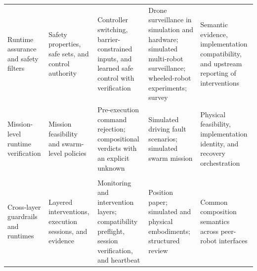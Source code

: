 \begin{table}[!t]
\begin{tabularx}{\textwidth}{@{}P{0.15\textwidth}P{0.15\textwidth}P{0.21\textwidth}P{0.21\textwidth}Y@{}}
    Runtime assurance and safety filters \cite{sha2001simplex,desai2019soter,shivakumar2020soterros,ames2017cbf,wang2017barrier,garg2024safecontrol}
      & Safety properties, safe sets, and control authority
      & Controller switching, barrier-constrained inputs, and learned safe control with verification
      & Drone surveillance in simulation and hardware; simulated multi-robot surveillance; wheeled-robot experiments; survey
      & Semantic evidence, implementation compatibility, and upstream reporting of interventions \\
    Mission-level runtime verification \cite{tsai2026missionrta,kekatos2026swarmrta}
      & Mission feasibility and swarm-level policies
      & Pre-execution command rejection; compositional verdicts with an explicit unknown
      & Simulated driving fault scenarios; simulated swarm mission
      & Physical feasibility, implementation identity, and recovery orchestration \\
    \addlinespace[2pt]
     \\
    Cross-layer guardrails and runtimes \cite{kim2026guardrails,liu2026phyagentos,kim2026safeembodied}
      & Layered interventions, execution sessions, and evidence
      & Monitoring and intervention layers; compatibility preflight, session verification, and heartbeat
      & Position paper; simulated and physical embodiments; structured review
      & Common composition semantics across peer-robot interfaces \\
    \bottomrule
  \end{tabularx}
\end{table}

